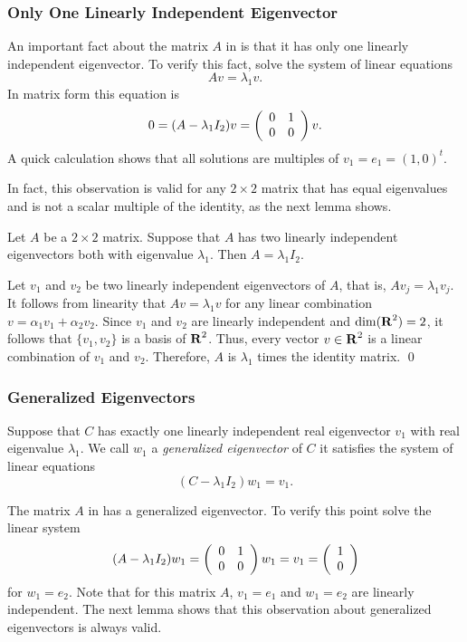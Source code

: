\subsubsection*{Only One Linearly Independent Eigenvector}

An important fact about the matrix $A$ in  is that it has
only one linearly independent eigenvector.  To verify this fact, solve the
system of linear equations
\[
Av = \lambda_1v.
\]
In matrix form this equation is
\[
0 = (A-\lambda_1I_2)v = \left(\begin{array}{rr} 0 & 1\\ 0 &0\end{array}\right)v.
\]
A quick calculation shows that all solutions are multiples of
$v_1=e_1=(1,0)^t$.

In fact, this observation is valid for any $2\times 2$ matrix that has
equal eigenvalues and is not a scalar multiple of the identity, as the next
lemma shows.

\begin{lemma}  \label{L:1indeig}
Let $A$ be a $2\times 2$ matrix.  Suppose that $A$ has two linearly
independent eigenvectors both with eigenvalue $\lambda_1$.
Then $A=\lambda_1 I_2$.
\end{lemma}

\proof  Let $v_1$ and $v_2$ be two linearly independent
eigenvectors of $A$, that is, $Av_j = \lambda_1 v_j$.  It follows
from linearity that $Av=\lambda_1 v$ for any linear combination
$v=\alpha_1v_1+\alpha_2v_2$.  Since $v_1$ and $v_2$ are linearly
independent and $\dim(\mbox{$\bf{R}$}^2)=2$, it follows that $\{v_1,v_2\}$ is
a basis of $\mbox{$\bf{R}$}^2$.  Thus, every vector $v\in\mbox{$\bf{R}$}^2$ is a linear
combination of $v_1$ and $v_2$.  Therefore, $A$ is $\lambda_1$ times
the identity matrix.  \qed

\subsubsection*{Generalized Eigenvectors}

Suppose that $C$ has exactly one linearly independent real eigenvector $v_1$
with real eigenvalue $\lambda_1$.  We call $w_1$ a {\em generalized
eigenvector\/} of $C$ it satisfies the
system of linear equations
\begin{equation} \label{e:Cw=lw+va}
(C-\lambda_1I_2)w_1 = v_1.
\end{equation}

The matrix $A$ in  has a generalized eigenvector. To verify
this point solve the linear system
\[
(A-\lambda_1I_2)w_1 = \left(\begin{array}{rr} 0 & 1\\ 0 &0\end{array}\right)w_1 = v_1 = \left(\begin{array}{r} 1 \\ 0\end{array}\right)
\]
for $w_1=e_2$.   Note that for this matrix $A$, $v_1=e_1$ and $w_1=e_2$ are
linearly independent.  The next lemma shows that this observation about
generalized eigenvectors is always valid.

